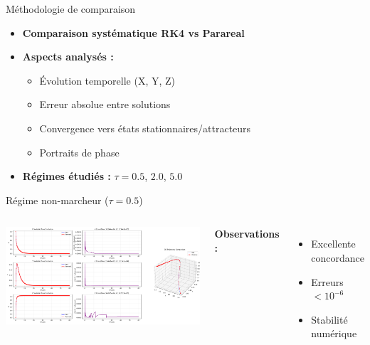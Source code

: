 
\begin{frame}{Méthodologie de comparaison}
    \begin{itemize}
        \item \textbf{Comparaison systématique RK4 vs Parareal}
        \item \textbf{Aspects analysés :}
        \begin{itemize}
            \item Évolution temporelle (X, Y, Z)
            \item Erreur absolue entre solutions
            \item Convergence vers états stationnaires/attracteurs
            \item Portraits de phase
        \end{itemize}
        \item \textbf{Régimes étudiés :} $\tau = 0.5$, $2.0$, $5.0$
    \end{itemize}
\end{frame}

\begin{frame}{Régime non-marcheur ($\tau = 0.5$)}
    \begin{columns}
        \includegraphics[width=\textwidth]{../Document/figures/comparisons/comparison_tau0.5_comparison}
        
        \textbf{Observations :}
        \begin{itemize}
            \item Excellente concordance
            \item Erreurs $< 10^{-6}$
            \item Stabilité numérique
        \end{itemize}
    \end{columns}
\end{frame}

